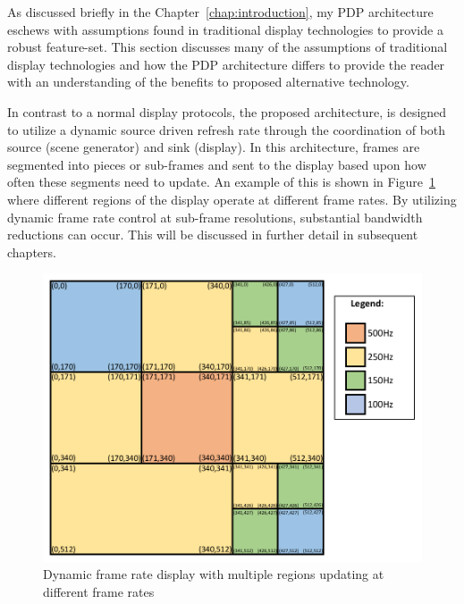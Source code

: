     As discussed briefly in the Chapter~\ref{chap:introduction}, my PDP architecture eschews with assumptions found in traditional display technologies to provide a robust feature-set. This section discusses many of the assumptions of traditional display technologies and how the PDP architecture differs to provide the reader with an understanding of the benefits to proposed alternative technology.

    In contrast to a normal display protocols, the proposed architecture, is designed to utilize a dynamic source driven refresh rate through the coordination of both source (scene generator) and sink (display). In this architecture, frames are segmented into pieces or sub-frames and sent to the display based upon how often these segments need to update. An example of this is shown in Figure~\ref{fig:variable_display} where different regions of the display operate at different frame rates. By utilizing dynamic frame rate control at sub-frame resolutions, substantial bandwidth reductions can occur. This will be discussed in further detail in subsequent chapters.

    \begin{figure}
        \centering
        \includegraphics[width=1.0\textwidth]{fig/variable_display.pdf}
        \caption{Dynamic frame rate display with multiple regions updating at different frame rates}
        \label{fig:variable_display}
    \end{figure}

